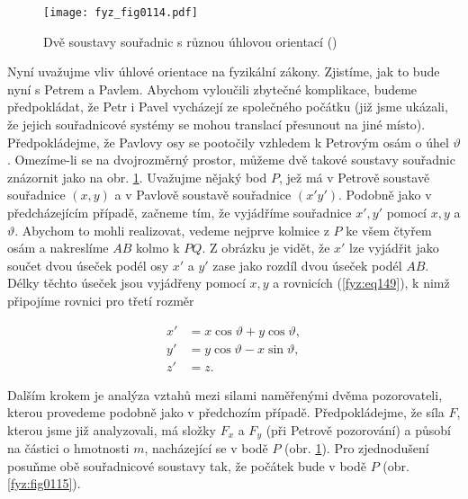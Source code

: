    \begin{figure}[ht!]  %
      \centering
      \texttt{[image: fyz\_fig0114.pdf]}
      \caption{Dvě soustavy souřadnic s různou úhlovou orientací
              (\cite[s.~156]{Feynman01})}
      \label{fyz:fig0114}
    \end{figure}
    Nyní uvažujme vliv úhlové orientace na fyzikální zákony. Zjistíme, jak to bude nyní s Petrem a 
    Pavlem. Abychom vyloučili zbytečné komplikace, budeme předpokládat, že Petr i Pavel vycházejí 
    ze společného počátku (již jsme ukázali, že jejich souřadnicové systémy se mohou translací 
    přesunout na jiné místo). Předpokládejme, že Pavlovy osy se pootočily vzhledem k Petrovým osám 
    o úhel \(\vartheta\). Omezíme-li se na dvojrozměrný prostor, můžeme dvě takové soustavy 
    souřadnic znázornit jako na obr. \ref{fyz:fig0114}. Uvažujme nějaký bod \(P\), jež má v Petrově 
    soustavě souřadnice \((x, y)\) a v Pavlově soustavě souřadnice \((x' y')\). Podobně jako v 
    předcházejícím případě, začneme tím, že vyjádříme souřadnice \(x', y'\) pomocí \(x, y\) a 
    \(\vartheta\). Abychom to mohli realizovat, vedeme nejprve kolmice z \(P\) ke všem čtyřem osám 
    a nakreslíme \(AB\) kolmo k \(PQ\). Z obrázku je vidět, že \(x'\) lze vyjádřit jako součet dvou 
    úseček podél osy \(x'\) a \(y'\) zase jako rozdíl dvou úseček podél \(AB\). Délky těchto úseček 
    jsou vyjádřeny pomocí \(x, y\) a rovnicích (\ref{fyz:eq149}), k nimž připojíme rovnici pro 
    třetí rozměr

    \begin{subequations}\label{fyz:eq149}
      \begin{align}
        x' &= x\cos\vartheta + y\cos\vartheta, \label{fyz:eq149a} \\
        y' &= y\cos\vartheta - x\sin\vartheta, \label{fyz:eq149b} \\
        z' &= z.
      \end{align}
    \end{subequations}

    Dalším krokem je analýza vztahů mezi silami naměřenými dvěma pozorovateli, kterou provedeme 
    podobně jako v předchozím případě. Předpokládejme, že síla \(F\), kterou jsme již analyzovali, 
    má složky \(F_x\) a \(F_y\) (při Petrově pozorování) a působí na částici o hmotnosti \(m\), 
    nacházející se v bodě \(P\) (obr. \ref{fyz:fig0114}). Pro zjednodušení posuňme obě souřadnicové 
    soustavy tak, že počátek bude v bodě \(P\) (obr. \ref{fyz:fig0115}).
    
